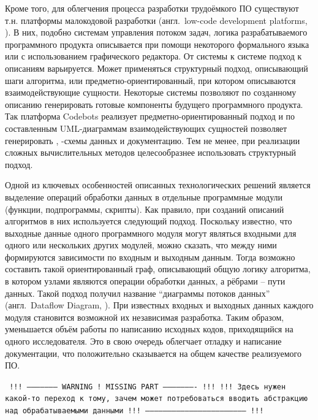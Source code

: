 Кроме того, для облегчения процесса разработки трудоёмкого ПО существуют т.н. платформы малокодовой разработки (англ.~low-code development platforms, )\cite{DiRuscio2022}. В них, подобно системам управления потоком задач, логика разрабатываемого программного продукта описывается при помощи некоторого формального языка или с использованием графического редактора. От системы к системе подход к описаниям варьируется. Может применяться структурный подход, описывающий шаги алгоритма, или предметно-ориентированный, при котором описываются взаимодействующие сущности. Некоторые системы позволяют по созданному описанию генерировать готовые компоненты будущего программного продукта. Так платформа Codebots реализует предметно-ориентированный подход и по составленным UML-диаграммам взаимодействующих сущностей позволяет генерировать , -схемы данных и документацию\cite{DiRuscio2022}. Тем не менее, при реализации сложных вычислительных методов целесообразнее использовать структурный подход.

Одной из ключевых особенностей описанных технологических решений является выделение операций обработки данных в отдельные программные модули (функции, подпрограммы, скрипты). Как правило, при созданий описаний алгоритмов в них используется следующий подход. Поскольку известно, что выходные данные одного программного модуля могут являться входными для одного или нескольких других модулей, можно сказать, что между ними формируются зависимости по входным и выходным данным. Тогда возможно составить такой ориентированный граф, описывающий общую логику алгоритма, в котором узлами являются операции обработки данных, а рёбрами -- пути данных. Такой подход получил название ``диаграммы потоков данных'' (англ.~Dataflow Diagram, ). При известных входных и выходных данных каждого модуля становится возможной их независимая разработка\cite{DanilovPar2011}. Таким образом, уменьшается объём работы по написанию исходных кодов, приходящийся на одного исследователя. Это в свою очередь облегчает отладку и написание документации, что положительно сказывается на общем качестве реализуемого ПО.


\texttt{
  !!! --------------------- WARNING ! MISSING PART ---------------------- !!! \newline
  !!! Здесь нужен какой-то переход к тому, зачем может потребоваться вводить абстракцию над обрабатываемыми данными \newline
  !!! -------------------------------------------------------------------- !!! \newline
}

